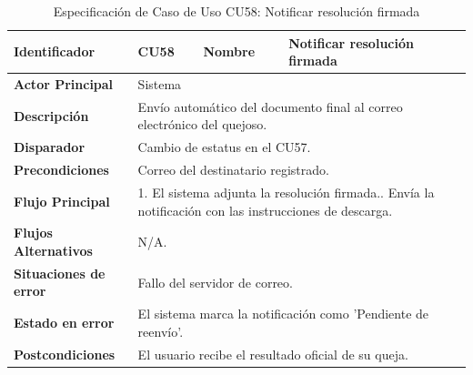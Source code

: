\begingroup
\setlength{\parskip}{0pt}
\begin{longtable}{|p{3.5cm}|p{2cm}|p{2.5cm}|p{7cm}|}
\caption{Especificación de Caso de Uso CU58: Notificar resolución firmada}
\label{tab:cu58} \\
\hline
\textbf{Identificador} & CU58 & \textbf{Nombre} & Notificar resolución firmada \\ \hline
\textbf{Actor Principal} & \multicolumn{3}{p{11.5cm}|}{Sistema} \\ \hline
\textbf{Descripción} & \multicolumn{3}{p{11.5cm}|}{Envío automático del documento final al correo electrónico del quejoso.} \\ \hline
\textbf{Disparador} & \multicolumn{3}{p{11.5cm}|}{Cambio de estatus en el CU57.} \\ \hline
\textbf{Precondiciones} & \multicolumn{3}{p{11.5cm}|}{Correo del destinatario registrado.} \\ \hline
\textbf{Flujo Principal} & \multicolumn{3}{p{11.5cm}|}{1. El sistema adjunta la resolución firmada.\newline 2. Envía la notificación con las instrucciones de descarga.} \\ \hline
\textbf{Flujos Alternativos} & \multicolumn{3}{p{11.5cm}|}{N/A.} \\ \hline
\textbf{Situaciones de error} & \multicolumn{3}{p{11.5cm}|}{Fallo del servidor de correo.} \\ \hline
\textbf{Estado en error} & \multicolumn{3}{p{11.5cm}|}{El sistema marca la notificación como 'Pendiente de reenvío'.} \\ \hline
\textbf{Postcondiciones} & \multicolumn{3}{p{11.5cm}|}{El usuario recibe el resultado oficial de su queja.} \\ \hline
\end{longtable}
\endgroup

\vspace{0.8cm}

